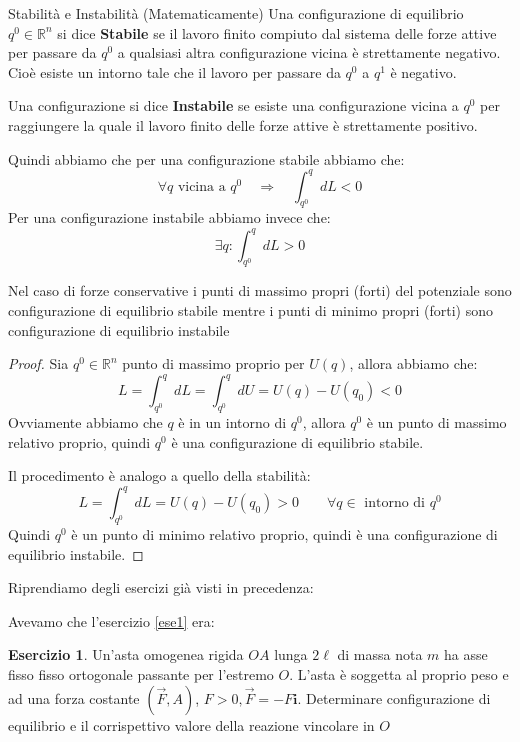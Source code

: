 \documentclass[11pt,a4paper,twoside]{article}
\theoremstyle{definition}
\newtheorem{ese}{Esercizio}[section]
\begin{document}
\begin{defn}{Stabilità e Instabilità (Matematicamente)}{}
	Una configurazione di equilibrio $q^0 \in \mathbb R^n$ si dice \textbf{Stabile} se il lavoro finito compiuto dal sistema delle forze attive per passare da $q^0$ a qualsiasi altra configurazione vicina è strettamente negativo. Cioè esiste un intorno tale che il lavoro per passare da $q^0$ a $q^1$ è negativo.

	Una configurazione si dice \textbf{Instabile} se esiste una configurazione vicina a $q^0$ per raggiungere la quale il lavoro finito delle forze attive è strettamente positivo.
\end{defn}

Quindi abbiamo che per una configurazione stabile abbiamo che:
\[ \forall q\text{ vicina a } q^0\quad \Rightarrow \quad \int_{q^0}^{q} dL<0 \]
Per una configurazione instabile abbiamo invece che:
\[ \exists q: \int_{q^0}^q dL>0 \]

\begin{prop}{}{}
	Nel caso di forze conservative i punti di massimo propri (forti) del potenziale sono configurazione di equilibrio stabile mentre i punti di minimo propri (forti) sono configurazione di equilibrio instabile
\end{prop}

\begin{proof}
	 Sia $q^0 \in \mathbb R^n$ punto di massimo proprio per $U(q)$, allora abbiamo che:
	\[ L = \int_{q^0}^q dL = \int_{q^0}^q dU = U(q) -U(q_0)<0 \]
	Ovviamente abbiamo che $q$ è in un intorno di $q^0$, allora $q^0$ è un punto di massimo relativo proprio, quindi $q^0$ è una configurazione di equilibrio stabile.

	 Il procedimento è analogo a quello della stabilità:
	\[ L = \int_{q^0}^q dL = U(q)-U(q_0)>0 \qquad \forall q \in \text{ intorno di }q^0 \]
	Quindi $q^0$ è un punto di minimo relativo proprio, quindi è una configurazione di equilibrio instabile.
\end{proof}

Riprendiamo degli esercizi già visti in precedenza:

Avevamo che l'esercizio \ref{ese1} era:

\begin{ese}
	Un'asta omogenea rigida $OA$ lunga $2\ell$ di massa nota $m$ ha asse fisso fisso ortogonale passante per l'estremo $O$. L'asta è soggetta al proprio peso e ad una forza costante $(\vec F, A)$, $F>0, \vec F = -F\mathbf i$. Determinare configurazione di equilibrio e il corrispettivo valore della reazione vincolare in $O$
\end{ese}
\end{document}
